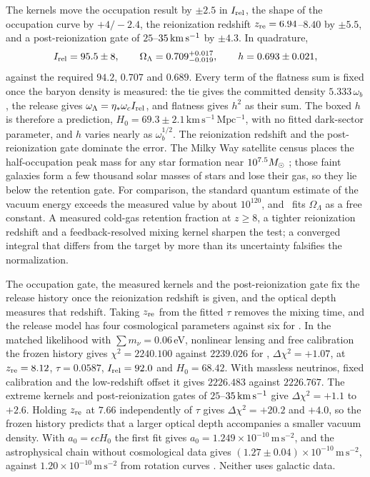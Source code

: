The kernels move the occupation result by $\pm2.5$ in $I_{\rm rel}$, the
shape of the occupation curve by $+4/-2.4$, the reionization redshift
$z_{\rm re}=6.94$--$8.40$ by $\pm5.5$, and a post-reionization gate of
$25$--$35\,\mathrm{km\,s^{-1}}$ by $\pm4.3$. In quadrature,
\begin{equation}
I_{\rm rel}=95.5\pm8,\qquad \Omega_\Lambda=0.709^{+0.017}_{-0.019},
\qquad h=0.693\pm0.021,
\end{equation}
against the required $94.2$, $0.707$ and $0.689$. Every term of the
flatness sum is fixed once the baryon density is measured: the tie gives
the committed density $5.333\,\omega_b$, the release gives
$\omega_\Lambda=\eta_*\omega_cI_{\rm rel}$, and flatness gives $h^2$ as their
sum. The boxed $h$ is therefore a prediction,
$H_0=69.3\pm2.1\,\mathrm{km\,s^{-1}\,Mpc^{-1}}$, with no fitted dark-sector
parameter, and $h$ varies nearly as $\omega_b^{1/2}$. The reionization
redshift and the post-reionization gate dominate the error. The Milky Way
satellite census places the half-occupation peak mass for any star
formation near $10^{7.5}M_\odot$ \cite{nadler20}; those faint galaxies form
a few thousand solar masses of stars and lose their gas, so they lie
below the retention gate. For comparison, the standard quantum estimate
of the vacuum energy exceeds the measured value by about $10^{120}$, and
\LCDM\ fits $\Omega_\Lambda$ as a free constant. A measured cold-gas
retention fraction at $z\ge8$, a tighter reionization redshift and a
feedback-resolved mixing kernel sharpen the test; a converged integral
that differs from the target by more than its uncertainty falsifies the
normalization.

The occupation gate, the measured kernels and the post-reionization gate
fix the release history once the reionization redshift is given, and the
optical depth measures that redshift. Taking $z_{\rm re}$ from the fitted
$\tau$ removes the mixing time, and the release model has four
cosmological parameters against six for \LCDM. In the matched likelihood
with $\sum m_\nu=0.06\,$eV, nonlinear lensing and free calibration the
frozen history gives $\chi^2=2240.100$ against $2239.026$ for \LCDM,
$\Delta\chi^2=+1.07$, at $z_{\rm re}=8.12$, $\tau=0.0587$, $I_{\rm rel}=92.0$
and $H_0=68.42$. With massless neutrinos, fixed calibration and the
low-redshift offset it gives $2226.483$ against $2226.767$. The extreme
kernels and post-reionization gates of $25$--$35\,\mathrm{km\,s^{-1}}$ give
$\Delta\chi^2=+1.1$ to $+2.6$. Holding $z_{\rm re}$ at $7.66$ independently
of $\tau$ gives $\Delta\chi^2=+20.2$ and $+4.0$, so the frozen history
predicts that a larger optical depth accompanies a smaller vacuum density.
With $a_0=\epsilon cH_0$ the first fit gives
$a_0=1.249\times10^{-10}\,\mathrm{m\,s^{-2}}$, and the astrophysical chain
without cosmological data gives $(1.27\pm0.04)\times10^{-10}\,\mathrm{m\,s^{-2}}$,
against $1.20\times10^{-10}\,\mathrm{m\,s^{-2}}$ from rotation curves
\cite{lelli17}. Neither uses galactic data.

